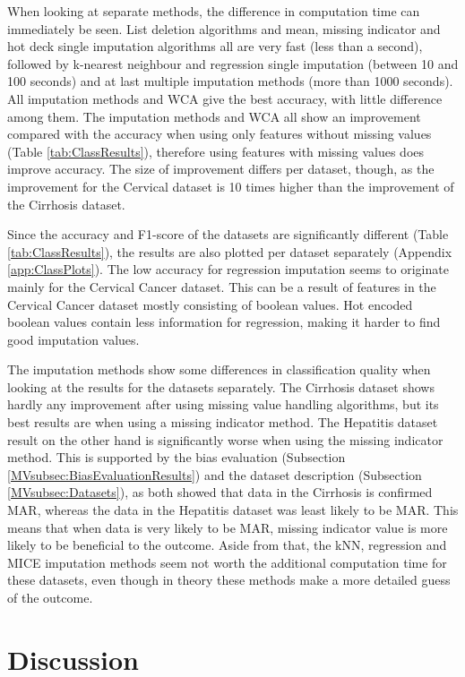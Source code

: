 \documentclass[10pt,a4paper]{report}
\begin{document}
	When looking at separate methods, the difference in computation time can immediately be seen. List deletion algorithms and mean, missing indicator and hot deck single imputation algorithms all are very fast (less than a second), followed by k-nearest neighbour and regression single imputation (between 10 and 100 seconds) and at last multiple imputation methods (more than 1000 seconds). All imputation methods and WCA give the best accuracy, with little difference among them. The imputation methods and WCA all show an improvement compared with the accuracy when using only features without missing values (Table \ref{tab:ClassResults}), therefore using features with missing values does improve accuracy. The size of improvement differs per dataset, though, as the improvement for the Cervical dataset is 10 times higher than the improvement of the Cirrhosis dataset. 
	
	Since the accuracy and F1-score of the datasets are significantly different (Table \ref{tab:ClassResults}), the results are also plotted per dataset separately (Appendix \ref{app:ClassPlots}). The low accuracy for regression imputation seems to originate mainly for the Cervical Cancer dataset. This can be a result of features in the Cervical Cancer dataset mostly consisting of boolean values. Hot encoded boolean values contain less information for regression, making it harder to find good imputation values. 
	
	The imputation methods show some differences in classification quality when looking at the results for the datasets separately. The Cirrhosis dataset shows hardly any improvement after using missing value handling algorithms, but its best results are when using a missing indicator method. The Hepatitis dataset result on the other hand is significantly worse when using the missing indicator method. This is supported by the bias evaluation (Subsection \ref{MVsubsec:BiasEvaluationResults}) and the dataset description (Subsection \ref{MVsubsec:Datasets}), as both showed that data in the Cirrhosis is confirmed MAR, whereas the data in the Hepatitis dataset was least likely to be MAR. This means that when data is very likely to be MAR, missing indicator value is more likely to be beneficial to the outcome. Aside from that, the kNN, regression and MICE imputation methods seem not worth the additional computation time for these datasets, even though in theory these methods make a more detailed guess of the outcome. 
	
	\section{Discussion}
	\label{MVsec:Discussion}
	
\end{document}
